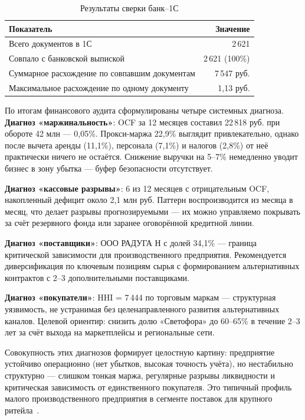 \begin{table}[H]
\centering
\caption{Результаты сверки банк--1С}
\label{tab:reconciliation}
\begin{tabular}{lr}
\toprule
\textbf{Показатель} & \textbf{Значение} \\
\midrule
Всего документов в 1С & 2\,621 \\
Совпало с банковской выпиской & 2\,621 (100\%) \\
Суммарное расхождение по совпавшим документам & 7\,547 руб. \\
Максимальное расхождение по одному документу & 1,13 руб. \\
\bottomrule
\end{tabular}
\end{table}

По итогам финансового аудита сформулированы четыре системных диагноза. \textbf{Диагноз «маржинальность»}: OCF за 12 месяцев составил 22\,818 руб. при обороте 42 млн --- 0,05\%. Прокси-маржа 22,9\% выглядит привлекательно, однако после вычета аренды (11,1\%), персонала (7,1\%) и налогов (2,8\%) от неё практически ничего не остаётся. Снижение выручки на 5--7\% немедленно уводит бизнес в зону убытка --- буфер безопасности отсутствует.

\textbf{Диагноз «кассовые разрывы»}: 6 из 12 месяцев с отрицательным OCF, накопленный дефицит около 2,1 млн руб. Паттерн воспроизводится из месяца в месяц, что делает разрывы прогнозируемыми --- их можно управляемо покрывать за счёт резервного фонда или заранее оговорённой кредитной линии.

\textbf{Диагноз «поставщики»}: ООО РАДУГА Н с долей 34,1\% --- граница критической зависимости для производственного предприятия. Рекомендуется диверсификация по ключевым позициям сырья с формированием альтернативных контрактов с 2--3 дополнительными поставщиками.

\textbf{Диагноз «покупатели»}: HHI = 7\,444 по торговым маркам --- структурная уязвимость, не устранимая без целенаправленного развития альтернативных каналов. Целевой ориентир: снизить долю «Светофора» до 60--65\% в течение 2--3 лет за счёт выхода на маркетплейсы и региональные сети.

Совокупность этих диагнозов формирует целостную картину: предприятие устойчиво операционно (нет убытков, высокая точность учёта), но нестабильно структурно --- слишком тонкая маржа, регулярные разрывы ликвидности и критическая зависимость от единственного покупателя. Это типичный профиль малого производственного предприятия в сегменте поставок для крупного ритейла~\cite{sme_profitability_ru}.

